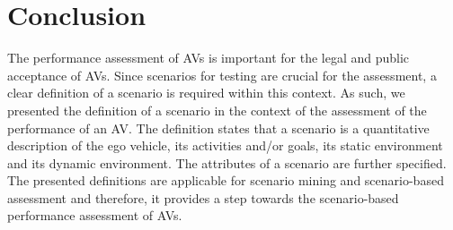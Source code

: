 \section{Conclusion}
\label{sec:conclusion}

The performance assessment of AVs is important for the legal and public acceptance of AVs. Since scenarios for testing are crucial for the assessment, a clear definition of a scenario is required within this context. As such, we presented the definition of a scenario in the context of the assessment of the performance of an AV. The definition states that a scenario is a quantitative description of the ego vehicle, its activities and/or goals, its static environment and its dynamic environment. The attributes of a scenario are further specified. The presented definitions are applicable for scenario mining and scenario-based assessment and therefore, it provides a step towards the scenario-based performance assessment of AVs. 
